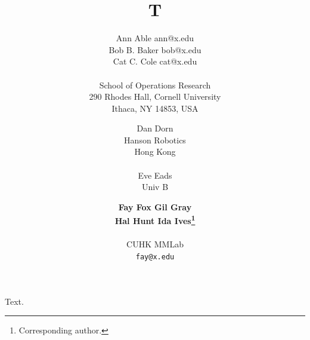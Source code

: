 \documentclass{article}
\title{T}
\author{\name Ann Able \email ann@x.edu \\
\name Bob B. Baker \email bob@x.edu \\
\name Cat C. Cole \email cat@x.edu \\\\
\addr School of Operations Research \\
290 Rhodes Hall, Cornell University \\
Ithaca, NY 14853, USA
\and Dan Dorn \\
Hanson Robotics \\
Hong Kong \\
\\
Eve Eads \\
Univ B
\and \textbf{Fay Fox \quad Gil Gray} \\
\textbf{Hal Hunt \quad Ida Ives\thanks{Corresponding author.}} \\
\\
CUHK MMLab \\
\texttt{fay@x.edu}}
\begin{document}
\maketitle
Text.
\end{document}

